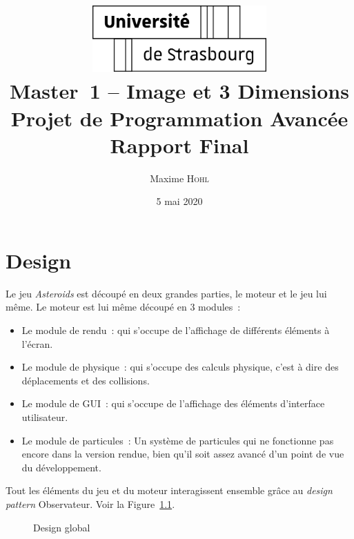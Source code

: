 \documentclass[10pt, french, a4paper]{report}
\title{
	\includegraphics[width=0.5\textwidth]{logo-uds.pdf}\\
	\vspace{2em}
	Master~1 -- Image et 3 Dimensions\\
	Projet de Programmation Avancée\\
	Rapport Final
}
\author{Maxime \textsc{Hohl}}
\date{5 mai 2020}
\begin{document}
\maketitle

\tableofcontents

\chapter{Design}

Le jeu \textit{Asteroids} est découpé en deux grandes parties, le moteur et le jeu lui 
même. Le moteur est lui même découpé en 3 modules~:
\begin{itemize}
	\item Le module de rendu~: qui s'occupe de l'affichage de différents éléments à l'écran.
	\item Le module de physique~: qui s'occupe des calculs physique, c'est à dire des
	      déplacements et des collisions.
	\item Le module de GUI~: qui s'occupe de l'affichage des éléments d'interface utilisateur.
	\item Le module de particules~: Un système de particules qui ne fonctionne pas encore 
	      dans la version rendue, bien qu'il soit assez avancé d'un point de vue du 
	      développement.
\end{itemize}

Tout les éléments du jeu et du moteur interagissent ensemble grâce au \textit{design pattern} Observateur. Voir la Figure~\ref{fig:design-global}.

\begin{figure}[h]
	\center
	\caption{Design global}
	\label{fig:design-global}
\end{figure}
\end{document}
